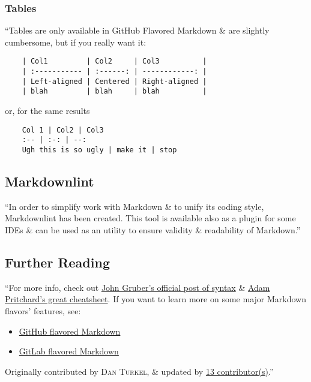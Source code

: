 \documentclass[oneside]{book}
\numberwithin{equation}{section}
\begin{document}
\subsubsection{Tables}
``Tables are only available in GitHub Flavored Markdown \& are slightly cumbersome, but if you really want it:
\begin{verbatim}
	| Col1         | Col2     | Col3          |
	| :----------- | :------: | ------------: |
	| Left-aligned | Centered | Right-aligned |
	| blah         | blah     | blah          |
\end{verbatim}
or, for the same results
\begin{verbatim}
	Col 1 | Col2 | Col3
	:-- | :-: | --:
	Ugh this is so ugly | make it | stop
\end{verbatim}

\subsection{Markdownlint}
``In order to simplify work with Markdown \& to unify its coding style, Markdownlint has been created. This tool is available also as a plugin for some IDEs \& can be used as an utility to ensure validity \& readability of Markdown.''

\subsection{Further Reading}
``For more info, check out \href{http://daringfireball.net/projects/markdown/syntax}{John Gruber's official post of syntax} \& \href{https://github.com/adam-p/markdown-here/wiki/Markdown-Cheatsheet}{Adam Pritchard's great cheatsheet}. If you want to learn more on some major Markdown flavors' features, see:
\begin{itemize}
	\item \href{https://docs.github.com/en/github/writing-on-github/getting-started-with-writing-and-formatting-on-github/basic-writing-and-formatting-syntax}{GitHub flavored Markdown}
	\item \href{https://docs.gitlab.com/ee/user/markdown.html}{GitLab flavored Markdown}
\end{itemize}
Originally contributed by \textsc{Dan Turkel}, \& updated by \href{https://github.com/adambard/learnxinyminutes-docs/blame/master/markdown.html.markdown}{13 contributor(s)}.'' 


\begin{thebibliography}{99}
	\bibitem[]{}
\end{thebibliography}


\printbibliography[heading=bibintoc]
	
\end{document}
